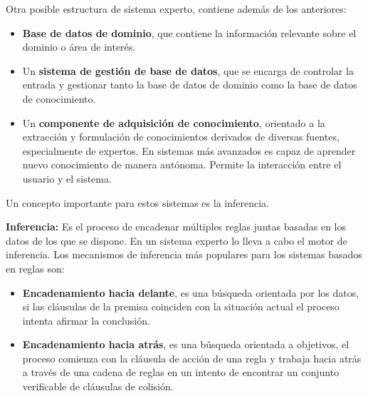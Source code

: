 \documentclass[12pt, twoside, openright]{report} %
\begin{document}
Otra posible estructura de sistema experto, contiene además de los anteriores:
\begin{itemize}
    \item \textbf{Base de datos de dominio}, que contiene la información relevante sobre el dominio o área de interés.
    \item Un \textbf{sistema de gestión de base de datos}, que se encarga de controlar la entrada y gestionar tanto la base de datos de dominio como la base de datos de conocimiento.
    \item Un \textbf{componente de adquisición de conocimiento},  orientado a la extracción y formulación de conocimientos derivados de diversas fuentes, especialmente de expertos. En sistemas más avanzados es capaz de aprender nuevo conocimiento de manera autónoma. Permite la interacción entre el usuario  y el sistema.
\end{itemize}

Un concepto importante para estos sistemas es la inferencia.

\textbf{Inferencia:} Es el proceso de encadenar múltiples reglas juntas basadas en los datos de los que se dispone. En un sistema experto lo lleva a cabo el motor de inferencia. Los mecanismos de inferencia más populares para los sistemas basados en reglas son:
 \begin{itemize}
     \item \textbf{Encadenamiento hacia delante}, es una búsqueda orientada por los datos, si las cláusulas de la premisa coinciden con la situación actual el proceso intenta afirmar la conclusión.
     \item \textbf{Encadenamiento hacia atrás}, es una búsqueda orientada a objetivos, el proceso comienza con la cláusula de acción de una regla y  trabaja hacia atrás a través de una cadena de reglas en un intento de encontrar un conjunto verificable de cláusulas de colisión.
 \end{itemize}
 
\end{document}
